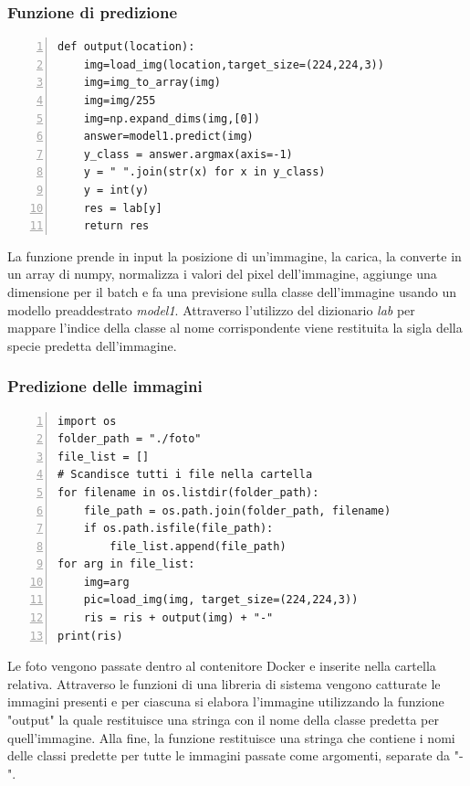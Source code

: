 \documentclass[a4paper,final,12pt]{report}
\begin{document}
\subsubsection{Funzione di predizione}
\begin{lstlisting}[caption={Codice della funzione di predizione.}, label={lst:funzione_predizione}, breaklines, escapechar=`\%, frame=lines, basicstyle=\small\ttfamily, keepspaces=true, numbers=left]
def output(location):
    img=load_img(location,target_size=(224,224,3))
    img=img_to_array(img)
    img=img/255
    img=np.expand_dims(img,[0])
    answer=model1.predict(img)
    y_class = answer.argmax(axis=-1)
    y = " ".join(str(x) for x in y_class)
    y = int(y)
    res = lab[y]
    return res
\end{lstlisting}
La funzione prende in input la posizione di un'immagine, la carica, la converte in un array di numpy, normalizza i valori del pixel dell'immagine, aggiunge una dimensione per il batch e fa una previsione sulla classe dell'immagine usando un modello preaddestrato \textit{model1}. Attraverso l'utilizzo del dizionario \textit{lab} per mappare l'indice della classe al nome corrispondente viene restituita la sigla della specie predetta dell'immagine.

\subsubsection{Predizione delle immagini}
\begin{lstlisting}[caption={Codice della predizione delle immagini.}, label={lst:Immagini_predizione}, breaklines, escapechar=`\%, frame=lines, basicstyle=\small\ttfamily, keepspaces=true, numbers=left]
import os
folder_path = "./foto"
file_list = []
# Scandisce tutti i file nella cartella
for filename in os.listdir(folder_path):
    file_path = os.path.join(folder_path, filename)
    if os.path.isfile(file_path):
        file_list.append(file_path)
for arg in file_list:
    img=arg
    pic=load_img(img, target_size=(224,224,3))
    ris = ris + output(img) + "-"
print(ris)
\end{lstlisting}
Le foto vengono passate dentro al contenitore Docker e inserite nella cartella relativa. Attraverso le funzioni di una libreria di sistema vengono catturate le immagini presenti e per ciascuna si elabora l'immagine utilizzando la funzione "output" la quale restituisce una stringa con il nome della classe predetta per quell'immagine. Alla fine, la funzione restituisce una stringa che contiene i nomi delle classi predette per tutte le immagini passate come argomenti, separate da "-".
\end{document}

